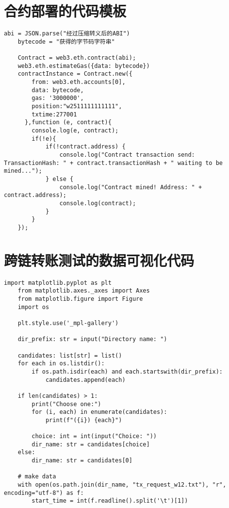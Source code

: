 \begin{appendices}
  \section{合约部署的代码模板}

  \begin{lstlisting}[caption={合约部署代码模板}, label={lst:合约部署代码模板}]
    abi = JSON.parse("经过压缩转义后的ABI")
    bytecode = "获得的字节码字符串"

    Contract = web3.eth.contract(abi);
    web3.eth.estimateGas({data: bytecode})
    contractInstance = Contract.new({
        from: web3.eth.accounts[0],
        data: bytecode,
        gas: '3000000',
        position:"w2511111111111",
        txtime:277001
      },function (e, contract){
        console.log(e, contract);
        if(!e){
            if(!contract.address) {
                console.log("Contract transaction send: TransactionHash: " + contract.transactionHash + " waiting to be mined...");
            } else {
                console.log("Contract mined! Address: " + contract.address);
                console.log(contract);
            }
        }
    });
\end{lstlisting}

  \section{跨链转账测试的数据可视化代码}
  \begin{lstlisting}[caption={跨链转账测试的数据可视化}, label={lst:跨链转账测试的数据可视化}]
    import matplotlib.pyplot as plt
    from matplotlib.axes._axes import Axes
    from matplotlib.figure import Figure
    import os

    plt.style.use('_mpl-gallery')

    dir_prefix: str = input("Directory name: ")

    candidates: list[str] = list()
    for each in os.listdir():
        if os.path.isdir(each) and each.startswith(dir_prefix):
            candidates.append(each)

    if len(candidates) > 1:
        print("Choose one:")
        for (i, each) in enumerate(candidates):
            print(f"({i}) {each}")

        choice: int = int(input("Choice: "))
        dir_name: str = candidates[choice]
    else:
        dir_name: str = candidates[0]

    # make data
    with open(os.path.join(dir_name, "tx_request_w12.txt"), "r", encoding="utf-8") as f:
        start_time = int(f.readline().split('\t')[1])


\end{lstlisting}
\end{appendices}
